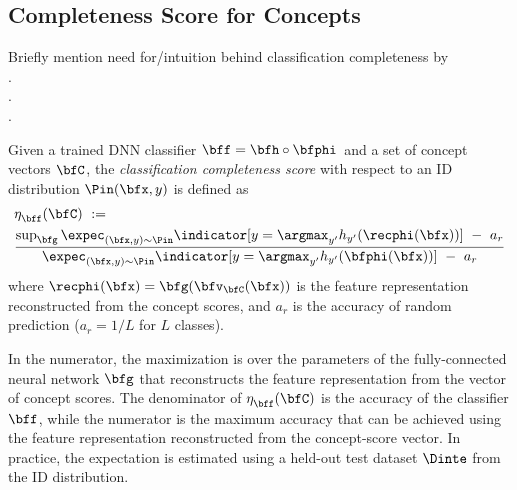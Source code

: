 \subsection{Completeness Score for Concepts}
\label{sec:completeness_score}
Briefly mention need for/intuition behind classification completeness by \cite{yeh2019completeness}\\.\\.\\.
%
\begin{definition}
\label{def:completeness_class}
Given a trained DNN classifier $\bff = \bfh \circ \bfphi\,$ and a set of concept vectors $\bfC$, the {\em classification completeness score} with respect to an ID distribution $\Pin(\bfx, y)$ is defined as \cite{yeh2019completeness}
\begin{align}
\label{equ: completeness-classification}
    &\eta^{}_\bff(\bfC) ~:= \\ 
    &\frac{\textrm{sup}_\bfg \,\expec_{(\bfx, y) \sim \Pin} \indicator[ y = \argmax_{y'} h_{y'}(\recphi(\bfx)) ] ~-~ a_r}{\expec_{(\bfx, y) \sim \Pin} \indicator[y = \argmax_{y'} h_{y'}(\bfphi(\bfx))] ~-~ a_r} \nonumber
\end{align}
where $\recphi(\bfx) = \bfg(\bfv_{\bfC}(\bfx))$ is the feature representation reconstructed from the concept scores, and $a_r$ is the accuracy of random prediction (\ie $a_r = 1/L$ for $L$ classes).
\end{definition}
In the numerator, the maximization is over the parameters of the fully-connected neural network $\bfg$ that reconstructs the feature representation from the vector of concept scores.
The denominator of $\eta^{}_\bff(\bfC)$ is the accuracy of the classifier $\bff$, while the numerator is the maximum accuracy that can be achieved using the feature representation reconstructed from the concept-score vector.
In practice, the expectation is estimated using a held-out test dataset $\Dinte$ from the ID distribution.


